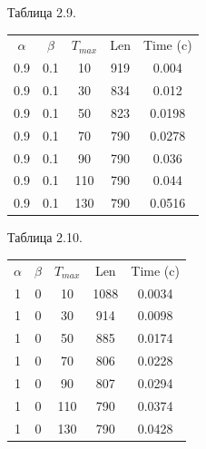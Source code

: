 \documentclass[12pt]{report}
\begin{document}
	\begin{minipage}{0.5\textwidth}
		\begin{center}
			Таблица 2.9.
			
			\begin{tabular}{|c c c c c|}
				\hline
				$\alpha$ & $\beta$ & $T_{max}$ & Len & Time (c) \\ [0.5ex]
				0.9 & 0.1 & 10 & 919 & 0.004 \\ 
				\hline 
				0.9 & 0.1 & 30 & 834 & 0.012 \\ 
				\hline 
				0.9 & 0.1 & 50 & 823 & 0.0198 \\ 
				\hline 
				0.9 & 0.1 & 70 & 790 & 0.0278 \\ 
				\hline 
				0.9 & 0.1 & 90 & 790 & 0.036 \\ 
				\hline 
				0.9 & 0.1 & 110 & 790 & 0.044 \\ 
				\hline 
				0.9 & 0.1 & 130 & 790 & 0.0516 \\ 
				\hline 
			\end{tabular}
		\end{center}
	\end{minipage}
	\hfill
	\begin{minipage}{0.5\textwidth}
		\begin{center}
			Таблица 2.10.
			
			\begin{tabular}{|c c c c c|}
				\hline
				$\alpha$ & $\beta$ & $T_{max}$ & Len & Time (c) \\ [0.5ex]
				1 & 0 & 10 & 1088 & 0.0034 \\ 
				\hline 
				1 & 0 & 30 & 914 & 0.0098 \\ 
				\hline 
				1 & 0 & 50 & 885 & 0.0174 \\ 
				\hline 
				1 & 0 & 70 & 806 & 0.0228 \\ 
				\hline 
				1 & 0 & 90 & 807 & 0.0294 \\ 
				\hline 
				1 & 0 & 110 & 790 & 0.0374 \\ 
				\hline 
				1 & 0 & 130 & 790 & 0.0428 \\ 
				\hline 
			\end{tabular}
		\end{center}
	\end{minipage}
	
\end{document}
